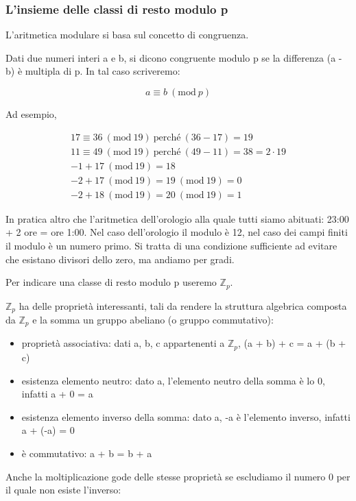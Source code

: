\documentclass{book}
\theoremstyle{definition}
\newcommand{\Mod}[1]{\ (\mathrm{mod}\ #1)}
\newcommand{\Zp}{\mathbb{Z}_{p}}
\begin{document}
\subsubsection{L'insieme delle classi di resto modulo p}

L'aritmetica modulare si basa sul concetto di congruenza.

Dati due numeri interi a e b, si dicono congruente modulo p se la differenza (a - b) è multipla di p. In tal caso scriveremo:

$$
a \equiv b \Mod{p}
$$

Ad esempio, 

\begin{align*}
    17 \equiv 36 \Mod{19} \ \text{perché} \ (36 - 17) = 19 \\
    11 \equiv 49 \Mod{19} \ \text{perché} \ (49 - 11) = 38 = 2 \cdot 19 \\
    -1 + 17 \Mod{19} = 18 \\
    -2 + 17 \Mod{19} = 19 \Mod{19} = 0 \\
    -2 + 18 \Mod{19} = 20 \Mod{19} = 1
\end{align*}

In pratica altro che l'aritmetica dell'orologio alla quale tutti siamo abituati: 23:00 + 2 ore = ore 1:00.
Nel caso dell'orologio il modulo è 12, nel caso dei campi finiti il modulo è un numero primo. Si tratta di una condizione sufficiente ad evitare che esistano divisori dello zero, ma andiamo per gradi.

Per indicare una classe di resto modulo p useremo $\Zp$.

$\mathbb{Z}_{p}$ ha delle proprietà interessanti, tali da rendere la struttura algebrica composta da $\Zp$ e la somma un gruppo abeliano (o gruppo commutativo):

\begin{itemize}
    \item proprietà associativa: dati a, b, c appartenenti a $\Zp$, (a + b) + c = a + (b + c)
    \item esistenza elemento neutro: dato a, l’elemento neutro della somma è lo 0, infatti a + 0 = a
    \item esistenza elemento inverso della somma: dato a, -a è l’elemento inverso, infatti a + (-a) = 0
    \item è commutativo: a + b = b + a
\end{itemize}

Anche la moltiplicazione gode delle stesse proprietà se escludiamo il numero 0 per il quale non esiste l’inverso:
\end{document}
